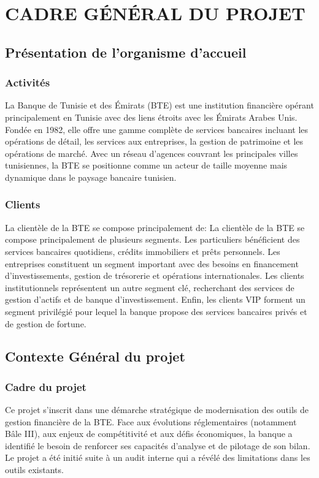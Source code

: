 \documentclass[12pt,a4paper]{report}
\begin{document}
\chapter{CADRE GÉNÉRAL DU PROJET}

\section{Présentation de l'organisme d'accueil}
\subsection{Activités}
La Banque de Tunisie et des Émirats (BTE) est une institution financière opérant principalement en Tunisie avec des liens étroits avec les Émirats Arabes Unis. Fondée en 1982, elle offre une gamme complète de services bancaires incluant les opérations de détail, les services aux entreprises, la gestion de patrimoine et les opérations de marché. Avec un réseau d'agences couvrant les principales villes tunisiennes, la BTE se positionne comme un acteur de taille moyenne mais dynamique dans le paysage bancaire tunisien.

\subsection{Clients}
La clientèle de la BTE se compose principalement de:
La clientèle de la BTE se compose principalement de plusieurs segments. Les particuliers bénéficient des services bancaires quotidiens, crédits immobiliers et prêts personnels. Les entreprises constituent un segment important avec des besoins en financement d'investissements, gestion de trésorerie et opérations internationales. Les clients institutionnels représentent un autre segment clé, recherchant des services de gestion d'actifs et de banque d'investissement. Enfin, les clients VIP forment un segment privilégié pour lequel la banque propose des services bancaires privés et de gestion de fortune.

\section{Contexte Général du projet}

\subsection{Cadre du projet}
Ce projet s'inscrit dans une démarche stratégique de modernisation des outils de gestion financière de la BTE. Face aux évolutions réglementaires (notamment Bâle III), aux enjeux de compétitivité et aux défis économiques, la banque a identifié le besoin de renforcer ses capacités d'analyse et de pilotage de son bilan. Le projet a été initié suite à un audit interne qui a révélé des limitations dans les outils existants.
\end{document}
